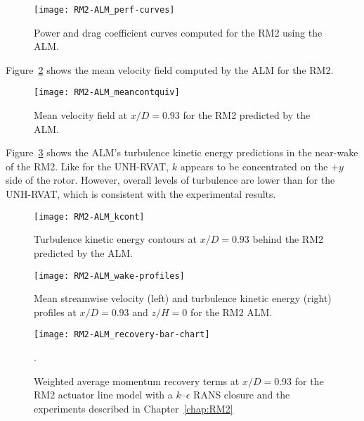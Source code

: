 \begin{figure}
    \centering
    
    \texttt{[image: RM2-ALM\_perf-curves]}
    
    \caption{Power and drag coefficient curves computed for the RM2 using the
        ALM.}
    
    \label{fig:RM2-ALM-perf-curves}
\end{figure}

Figure~\ref{fig:RM2-ALM-meancontquiv} shows the mean velocity field computed
by the ALM for the RM2.

\begin{figure}
    \centering
    
    \texttt{[image: RM2-ALM\_meancontquiv]}
    
    \caption{Mean velocity field at $x/D=0.93$ for the RM2 predicted by the
        ALM.}
    
    \label{fig:RM2-ALM-meancontquiv}
\end{figure}

Figure~\ref{fig:RM2-ALM-kcont} shows the ALM's turbulence kinetic energy
predictions in the near-wake of the RM2. Like for the UNH-RVAT, $k$ appears to
be concentrated on the $+y$ side of the rotor. However, overall levels of
turbulence are lower than for the UNH-RVAT, which is consistent with the
experimental results.

\begin{figure}
    \centering
    
    \texttt{[image: RM2-ALM\_kcont]}
    
    \caption{Turbulence kinetic energy contours at $x/D=0.93$ behind the RM2
        predicted by the ALM.}
    
    \label{fig:RM2-ALM-kcont}
\end{figure}

\begin{figure}
    \centering
    
    \texttt{[image: RM2-ALM\_wake-profiles]}
    
    \caption{Mean streamwise velocity (left) and turbulence kinetic energy
        (right) profiles at $x/D=0.93$ and $z/H=0$ for the RM2 ALM.}
    
    \label{fig:RM2-ALM-profiles}
\end{figure}

\begin{figure}
    \centering
    
    \texttt{[image: RM2-ALM\_recovery-bar-chart]}
    
    \caption{Weighted average momentum recovery terms at $x/D=0.93$ for the RM2
        actuator line model with a $k$--$\epsilon$ RANS closure and the experiments
        described in Chapter~\ref{chap:RM2}}.
    
    \label{fig:RM2-ALM-recovery}
\end{figure}


